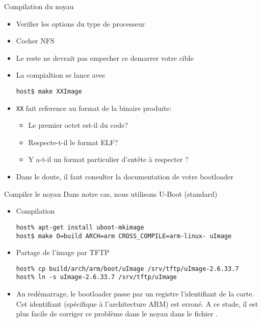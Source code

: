 \begin{frame}[fragile=singleslide]{Compilation du noyau}
  \begin{itemize}
  \item Verifier les options du type de processeur
  \item Cocher NFS
  \item Le reste ne devrait pas empecher ce demarrer votre cible
  \item La compialtion se lance avec
    \begin{lstlisting}
host$ make XXImage
    \end{lstlisting}
  \item \verb+XX+ fait reference au format de la binaire produite:
    \begin{itemize}
    \item Le premier octet est-il du code?
    \item Respecte-t-il le format ELF?
    \item Y a-t-il un format particulier d'entête à respecter ?
    \end{itemize}
  \item Dans  le doute,  il faut consulter  la documentation  de votre
    bootloader
  \end{itemize}
\end{frame}  

\begin{frame}[fragile=singleslide]{Compiler le noyau}
  Dans notre cas, nous utilisons U-Boot (standard)
  \begin{itemize}
  \item Compilation
    \begin{lstlisting}
host% apt-get install uboot-mkimage
host$ make O=build ARCH=arm CROSS_COMPILE=arm-linux- uImage
    \end{lstlisting}
  \item Partage de l'image par TFTP
    \begin{lstlisting}
host% cp build/arch/arm/boot/uImage /srv/tftp/uImage-2.6.33.7
host% ln -s uImage-2.6.33.7 /srv/tftp/uImage
    \end{lstlisting} %
  \item  Au   redémarrage,  le   bootloader  passe  par   un  registre
    l'identifiant  de   la  carte.   Cet   identifiant  (spécifique  à
    l'architecture ARM) est erroné. A  ce stade, il est plus facile de
    corriger   ce   problème   dans   le   noyau   dans   le   fichier
    .
  \end{itemize}
\end{frame}

